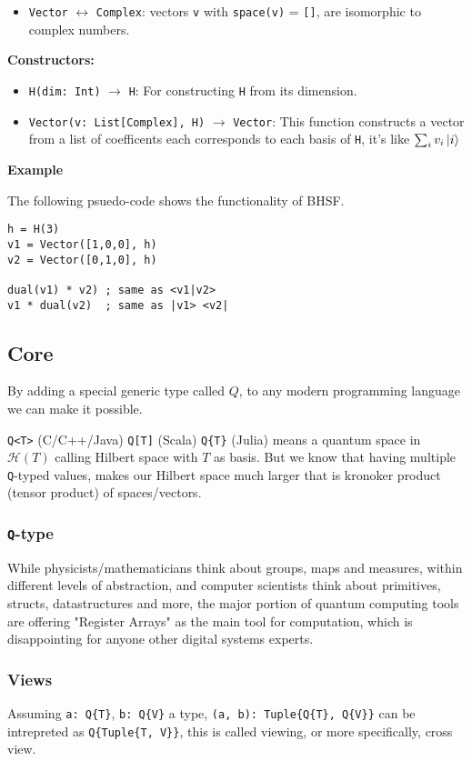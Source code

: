\documentclass[a4paper,11pt]{article}
\def\co{\lstinline}
\begin{document}
\begin{itemize}
	\item \co|Vector| \(\leftrightarrow\) \co|Complex|: vectors \co|v| with \co|space(v)| = \co|[]|, are isomorphic to complex numbers.
\end{itemize}
\textbf{Constructors: }
\begin{itemize}
	\item \co|H(dim: Int)| \(\to\) \co|H|: For constructing \co|H| from its dimension.
	\item \co|Vector(v: List[Complex], H)| \(\to\) \co|Vector|: This function constructs a vector from a list of coefficents each corresponds to each basis of \co|H|, it's like $\sum_i v_i \ket{i}$
\end{itemize}

\textbf{Example}

The following psuedo-code shows the functionality of BHSF.

\begin{lstlisting}
h = H(3)
v1 = Vector([1,0,0], h)
v2 = Vector([0,1,0], h)

dual(v1) * v2) ; same as <v1|v2>
v1 * dual(v2)  ; same as |v1> <v2|
\end{lstlisting}

\subsection{Core}

By adding a special generic type called $Q$, to any modern programming language we can make it possible.

\co{Q<T>} (C/C++/Java) \co{Q[T]} (Scala) \co|Q{T}| (Julia) means a quantum space in $\mathcal{H}(T)$ calling Hilbert space with $T$ as basis. But we know that having multiple \co{Q}-typed values, makes our Hilbert space much larger that is kronoker product (tensor product) of spaces/vectors.

\subsubsection{\co|Q|-type}
While physicists/mathematicians think about groups, maps and measures, within different levels of abstraction, and computer scientists think about primitives, structs, datastructures and more, the major portion of quantum computing tools are offering "Register Arrays" as the main tool for computation, which is disappointing for anyone other digital systems experts.

\subsubsection{Views}
Assuming \co|a: Q{T}|, \co|b: Q{V}| a type, \co|(a, b): Tuple{Q{T}, Q{V}}| can be intrepreted as \co|Q{Tuple{T, V}}|, this is called viewing, or more specifically, cross view.
\end{document}

